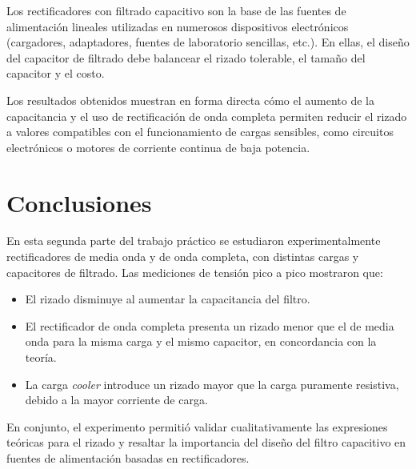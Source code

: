 \documentclass[a4paper,12pt]{article}
\begin{document}
Los rectificadores con filtrado capacitivo son la base de las fuentes de alimentación lineales utilizadas en numerosos dispositivos electrónicos (cargadores, adaptadores, fuentes de laboratorio sencillas, etc.). En ellas, el diseño del capacitor de filtrado debe balancear el rizado tolerable, el tamaño del capacitor y el costo.

Los resultados obtenidos muestran en forma directa cómo el aumento de la capacitancia y el uso de rectificación de onda completa permiten reducir el rizado a valores compatibles con el funcionamiento de cargas sensibles, como circuitos electrónicos o motores de corriente continua de baja potencia.

\section{Conclusiones}

En esta segunda parte del trabajo práctico se estudiaron experimentalmente rectificadores de media onda y de onda completa, con distintas cargas y capacitores de filtrado. Las mediciones de tensión pico a pico mostraron que:
\begin{itemize}
    \item El rizado disminuye al aumentar la capacitancia del filtro.
    \item El rectificador de onda completa presenta un rizado menor que el de media onda para la misma carga y el mismo capacitor, en concordancia con la teoría.
    \item La carga \emph{cooler} introduce un rizado mayor que la carga puramente resistiva, debido a la mayor corriente de carga.
\end{itemize}

En conjunto, el experimento permitió validar cualitativamente las expresiones teóricas para el rizado y resaltar la importancia del diseño del filtro capacitivo en fuentes de alimentación basadas en rectificadores.
\end{document}
